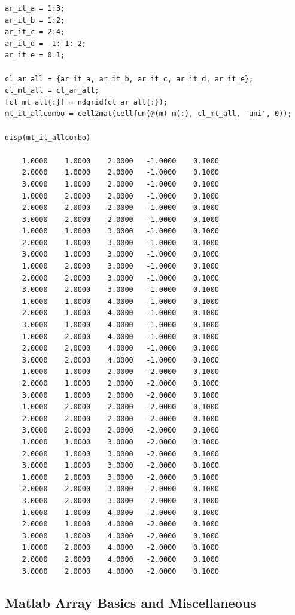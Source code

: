 \documentclass[
]{book}
\begin{document}
\begin{verbatim}
ar_it_a = 1:3;
ar_it_b = 1:2;
ar_it_c = 2:4;
ar_it_d = -1:-1:-2;
ar_it_e = 0.1;

cl_ar_all = {ar_it_a, ar_it_b, ar_it_c, ar_it_d, ar_it_e};
cl_mt_all = cl_ar_all;
[cl_mt_all{:}] = ndgrid(cl_ar_all{:});
mt_it_allcombo = cell2mat(cellfun(@(m) m(:), cl_mt_all, 'uni', 0));

disp(mt_it_allcombo)

    1.0000    1.0000    2.0000   -1.0000    0.1000
    2.0000    1.0000    2.0000   -1.0000    0.1000
    3.0000    1.0000    2.0000   -1.0000    0.1000
    1.0000    2.0000    2.0000   -1.0000    0.1000
    2.0000    2.0000    2.0000   -1.0000    0.1000
    3.0000    2.0000    2.0000   -1.0000    0.1000
    1.0000    1.0000    3.0000   -1.0000    0.1000
    2.0000    1.0000    3.0000   -1.0000    0.1000
    3.0000    1.0000    3.0000   -1.0000    0.1000
    1.0000    2.0000    3.0000   -1.0000    0.1000
    2.0000    2.0000    3.0000   -1.0000    0.1000
    3.0000    2.0000    3.0000   -1.0000    0.1000
    1.0000    1.0000    4.0000   -1.0000    0.1000
    2.0000    1.0000    4.0000   -1.0000    0.1000
    3.0000    1.0000    4.0000   -1.0000    0.1000
    1.0000    2.0000    4.0000   -1.0000    0.1000
    2.0000    2.0000    4.0000   -1.0000    0.1000
    3.0000    2.0000    4.0000   -1.0000    0.1000
    1.0000    1.0000    2.0000   -2.0000    0.1000
    2.0000    1.0000    2.0000   -2.0000    0.1000
    3.0000    1.0000    2.0000   -2.0000    0.1000
    1.0000    2.0000    2.0000   -2.0000    0.1000
    2.0000    2.0000    2.0000   -2.0000    0.1000
    3.0000    2.0000    2.0000   -2.0000    0.1000
    1.0000    1.0000    3.0000   -2.0000    0.1000
    2.0000    1.0000    3.0000   -2.0000    0.1000
    3.0000    1.0000    3.0000   -2.0000    0.1000
    1.0000    2.0000    3.0000   -2.0000    0.1000
    2.0000    2.0000    3.0000   -2.0000    0.1000
    3.0000    2.0000    3.0000   -2.0000    0.1000
    1.0000    1.0000    4.0000   -2.0000    0.1000
    2.0000    1.0000    4.0000   -2.0000    0.1000
    3.0000    1.0000    4.0000   -2.0000    0.1000
    1.0000    2.0000    4.0000   -2.0000    0.1000
    2.0000    2.0000    4.0000   -2.0000    0.1000
    3.0000    2.0000    4.0000   -2.0000    0.1000
\end{verbatim}

\hypertarget{matlab-array-basics-and-miscellaneous}{%
\subsection{Matlab Array Basics and Miscellaneous}\label{matlab-array-basics-and-miscellaneous}}
\end{document}
